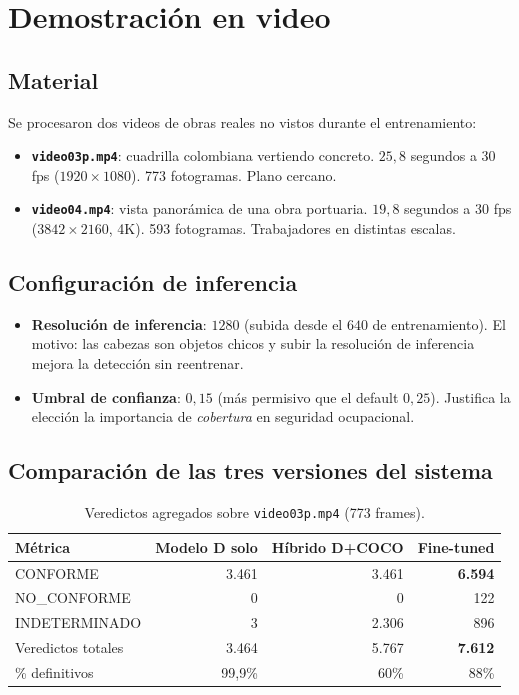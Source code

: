 \documentclass[11pt,a4paper]{article}
\begin{document}
\section{Demostración en video}

\subsection{Material}

Se procesaron dos videos de obras reales no vistos durante el
entrenamiento:
\begin{itemize}[leftmargin=*]
    \item \textbf{\texttt{video03p.mp4}}: cuadrilla colombiana vertiendo
    concreto. $25{,}8$ segundos a $30$ fps ($1920\times1080$). 773
    fotogramas. Plano cercano.
    \item \textbf{\texttt{video04.mp4}}: vista panorámica de una obra
    portuaria. $19{,}8$ segundos a $30$ fps ($3842\times2160$, 4K).
    593 fotogramas. Trabajadores en distintas escalas.
\end{itemize}

\subsection{Configuración de inferencia}

\begin{itemize}[leftmargin=*]
    \item \textbf{Resolución de inferencia}: $1280$ (subida desde el
    $640$ de entrenamiento). El motivo: las cabezas son objetos chicos
    y subir la resolución de inferencia mejora la detección sin
    reentrenar.
    \item \textbf{Umbral de confianza}: $0{,}15$ (más permisivo que el
    default $0{,}25$). Justifica la elección la importancia de
    \emph{cobertura} en seguridad ocupacional.
\end{itemize}

\subsection{Comparación de las tres versiones del sistema}

\begin{table}[H]
\centering
\caption{Veredictos agregados sobre \texttt{video03p.mp4} (773 frames).}
\begin{tabular}{l r r r}
\toprule
\textbf{Métrica} & \textbf{Modelo D solo} & \textbf{Híbrido D+COCO} & \textbf{Fine-tuned} \\
\midrule
CONFORME & 3.461 & 3.461 & \textbf{6.594} \\
NO\_CONFORME & 0 & 0 & 122 \\
INDETERMINADO & 3 & 2.306 & 896 \\
Veredictos totales & 3.464 & 5.767 & \textbf{7.612} \\
\% definitivos & 99{,}9\% & 60\% & 88\% \\
\bottomrule
\end{tabular}
\end{table}
\end{document}

